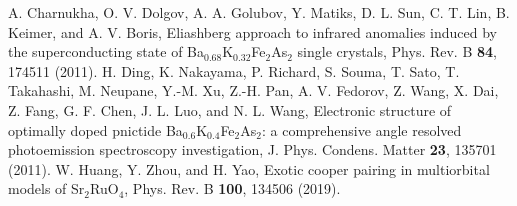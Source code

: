 \documentclass[prl,floatfix,twocolumn,showpacs,amsmath,superscriptaddress]{revtex4-2}
\begin{document}
\renewcommand*{\bibnumfmt}[1]{[S#1]}
\begin{thebibliography}{3}
	A. Charnukha, O. V. Dolgov, A. A. Golubov, Y. Matiks, D. L. Sun, C. T. Lin, B. Keimer, and A. V. Boris, Eliashberg approach to infrared anomalies induced by the superconducting state of Ba$_{0.68}$K$_{0.32}$Fe$_2$As$_2$ single crystals, Phys. Rev. B {\bf 84}, 174511 (2011).
	H. Ding, K. Nakayama, P. Richard, S. Souma, T. Sato, T. Takahashi, M. Neupane, Y.-M. Xu, Z.-H. Pan, A. V. Fedorov, Z. Wang, X. Dai, Z. Fang, G. F. Chen, J. L. Luo, and N. L. Wang, Electronic structure of optimally doped pnictide Ba$_{0.6}$K$_{0.4}$Fe$_{2}$As$_2$: a comprehensive angle resolved photoemission spectroscopy investigation, J. Phys. Condens. Matter {\bf 23}, 135701 (2011).	
	W. Huang, Y. Zhou, and H. Yao, Exotic cooper pairing in multiorbital models of Sr$_{2}$RuO$_4$, Phys. Rev. B {\bf 100}, 134506
	(2019).
\end{thebibliography}
\end{document}
